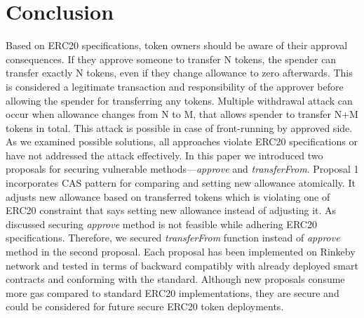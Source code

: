 
\section{Conclusion}
Based on ERC20 specifications, token owners should be aware of their approval consequences. If they approve someone to transfer N tokens, the spender can transfer exactly N tokens, even if they change allowance to zero afterwards. This is considered a legitimate transaction and responsibility of the approver before allowing the spender for transferring any tokens. Multiple withdrawal attack can occur when allowance changes from N to M, that allows spender to transfer N+M tokens in total. This attack is possible in case of front-running by approved side. As we examined possible solutions, all approaches violate ERC20 specifications or have not addressed the attack effectively. In this paper we introduced two proposals for securing vulnerable methods---\textit{approve} and \textit{transferFrom}. Proposal 1 incorporates CAS pattern for comparing and setting new allowance atomically. It adjusts new allowance based on transferred tokens which is violating one of ERC20 constraint that says setting new allowance instead of adjusting it. As discussed securing \textit{approve} method is not feasible while adhering ERC20 specifications. Therefore, we secured \textit{transferFrom} function instead of \textit{approve} method in the second proposal. Each proposal has been implemented on Rinkeby network and tested in terms of backward compatibly with already deployed smart contracts and conforming with the standard. Although new proposals consume more gas compared to standard ERC20 implementations, they are secure and could be considered for future secure ERC20 token deployments.
